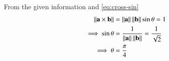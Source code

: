 From the given information and 
	\eqref{eq:cross-sin}
%
\begin{align}
	\left\lVert\mathbf{a} \times \mathbf{b}\right\rVert & = \left\lVert\mathbf{a}\right\rVert \left\lVert\mathbf{b}\right\rVert \sin \theta =1\\
\implies\sin \theta & = \frac{1} {\left\lVert\mathbf{a}\right\rVert \left\lVert\mathbf{b}\right\rVert}
 = \frac{1}{\sqrt{2}}\\
\implies\theta &= 
 \frac{\pi}{4} 
\end{align}
